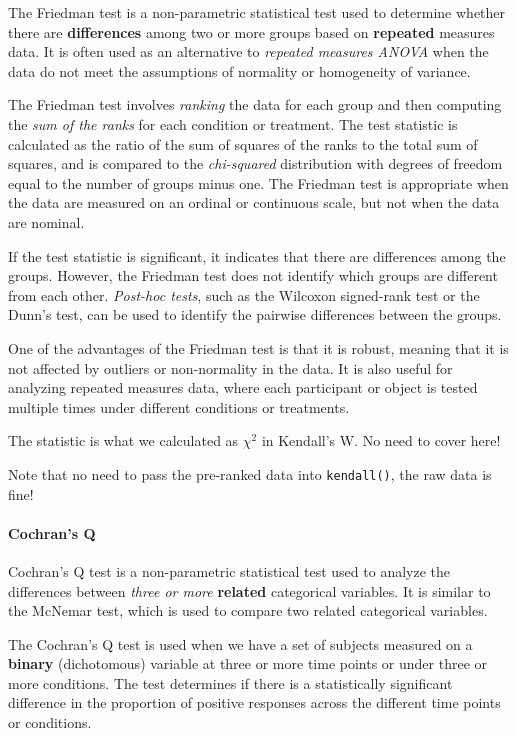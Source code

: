 \documentclass[
]{ctexart}
\begin{document}
The Friedman test is a non-parametric statistical test used to determine
whether there are \textbf{differences} among two or more groups based on
\textbf{repeated} measures data. It is often used as an alternative to
\emph{repeated measures ANOVA} when the data do not meet the assumptions
of normality or homogeneity of variance.

The Friedman test involves \emph{ranking} the data for each group and
then computing the \emph{sum of the ranks} for each condition or
treatment. The test statistic is calculated as the ratio of the sum of
squares of the ranks to the total sum of squares, and is compared to the
\emph{chi-squared} distribution with degrees of freedom equal to the
number of groups minus one. The Friedman test is appropriate when the
data are measured on an ordinal or continuous scale, but not when the
data are nominal.

If the test statistic is significant, it indicates that there are
differences among the groups. However, the Friedman test does not
identify which groups are different from each other. \emph{Post-hoc
tests}, such as the Wilcoxon signed-rank test or the Dunn's test, can be
used to identify the pairwise differences between the groups.

One of the advantages of the Friedman test is that it is robust, meaning
that it is not affected by outliers or non-normality in the data. It is
also useful for analyzing repeated measures data, where each participant
or object is tested multiple times under different conditions or
treatments.

The statistic is what we calculated as \(\chi^2\) in Kendall's W. No
need to cover here!

Note that no need to pass the pre-ranked data into \texttt{kendall()},
the raw data is fine!

\hypertarget{cochrans-q}{%
\paragraph{Cochran's Q}\label{cochrans-q}}

Cochran's Q test is a non-parametric statistical test used to analyze
the differences between \emph{three or more} \textbf{related}
categorical variables. It is similar to the McNemar test, which is used
to compare two related categorical variables.

The Cochran's Q test is used when we have a set of subjects measured on
a \textbf{binary} (dichotomous) variable at three or more time points or
under three or more conditions. The test determines if there is a
statistically significant difference in the proportion of positive
responses across the different time points or conditions.
\end{document}
